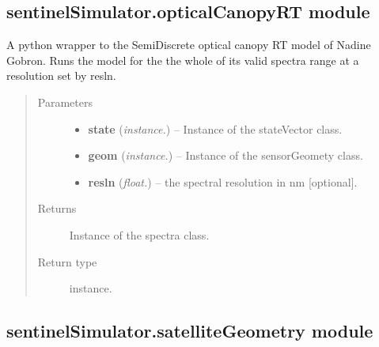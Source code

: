 \documentclass[letterpaper,10pt,english]{sphinxmanual}
\begin{document}
\subsection{sentinelSimulator.opticalCanopyRT module}
\label{source/sentinelSimulator:sentinelsimulator-opticalcanopyrt-module}\label{source/sentinelSimulator:module-sentinelSimulator.opticalCanopyRT}

\begin{fulllineitems}
\label{source/sentinelSimulator:sentinelSimulator.opticalCanopyRT.canopyRTOptical}
A python wrapper to the SemiDiscrete optical
canopy RT model of Nadine Gobron. Runs the
model for the the whole of its valid spectra
range at a resolution set by resln.
\begin{quote}\begin{description}
\item[{Parameters}] \leavevmode\begin{itemize}
\item {} 
\textbf{state} (\emph{instance.}) -- Instance of the stateVector class.

\item {} 
\textbf{geom} (\emph{instance.}) -- Instance of the sensorGeomety class.

\item {} 
\textbf{resln} (\emph{float.}) -- the spectral resolution in nm {[}optional{]}.

\end{itemize}

\item[{Returns}] \leavevmode
Instance of the spectra class.

\item[{Return type}] \leavevmode
instance.

\end{description}\end{quote}

\end{fulllineitems}



\subsection{sentinelSimulator.satelliteGeometry module}
\label{source/sentinelSimulator:sentinelsimulator-satellitegeometry-module}\label{source/sentinelSimulator:module-sentinelSimulator.satelliteGeometry}
\end{document}

